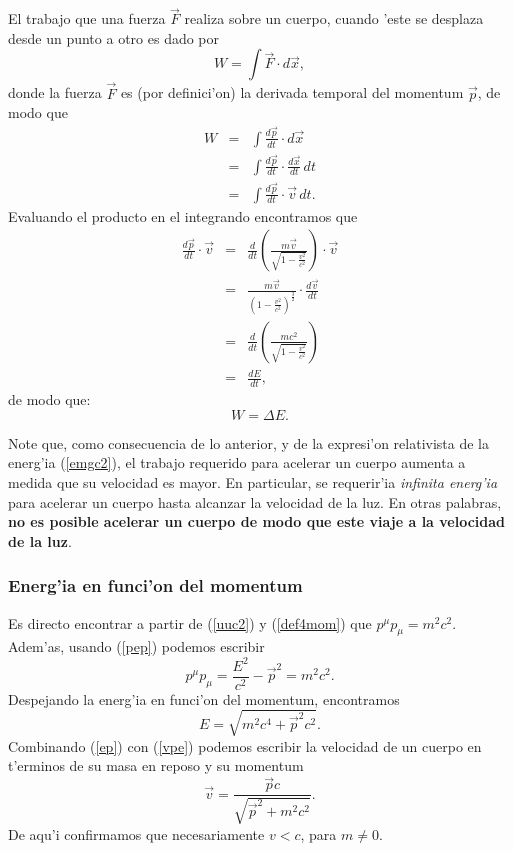 El trabajo que una fuerza $\vec{F}$ realiza sobre un cuerpo, cuando 'este se desplaza desde un punto a otro es dado por
\begin{equation}
W=\int\vec{F} \cdot d\vec{x},
\end{equation}
donde la fuerza $\vec{F}$ es (por definici'on) la derivada temporal del momentum $\vec{p}$, de modo
que
\begin{eqnarray}
W&=&\int\frac{d\vec{p}}{dt} \cdot d\vec{x}\\
&=&\int\frac{d\vec{p}}{dt} \cdot \frac{d\vec{x}}{dt}\,dt\\
&=&\int\frac{d\vec{p}}{dt} \cdot \vec{v}\,dt.
\end{eqnarray}
Evaluando el producto en el integrando encontramos que
\begin{eqnarray}
\frac{d\vec{p}}{dt} \cdot
\vec{v}&=&\frac{d}{dt}(\frac{m\vec{v}}{\sqrt{1-\frac{v^2}{c^2}}})\cdot
\vec{v}\\
&=&\frac{m\vec{v}}{(1-\frac{v^2}{c^2})^{\frac{3}{2}}}\cdot
\frac{d\vec{v}}{dt}\\
&=&\frac{d}{dt}(\frac{mc^2}{\sqrt{1-\frac{v^2}{c^2}}}) \\
&=&\frac{dE}{dt},
\end{eqnarray}
de modo que:
\begin{equation}
\boxed{W=\Delta E.}
\end{equation}

Note que, como consecuencia de lo anterior, y de la expresi'on relativista de la energ'ia (\ref{emgc2}), el trabajo requerido para acelerar un cuerpo aumenta a medida que su velocidad es mayor. En particular, se requerir'ia \textit{infinita energ'ia} para acelerar un cuerpo hasta alcanzar la velocidad de la luz. En otras palabras, \textbf{no es posible acelerar un cuerpo de modo que este viaje a la velocidad de la luz}.

\subsubsection{Energ'ia en funci'on del momentum}

Es directo encontrar a partir de (\ref{uuc2}) y (\ref{def4mom}) que $p^\mu
p_\mu=m^2c^2$. Adem'as, usando (\ref{pep}) podemos escribir
\begin{equation}
p^\mu p_\mu =\frac{E^2}{c^2}-\vec{p}^2=m^2c^2.
\end{equation}
Despejando la energ'ia en funci'on del momentum, encontramos
\begin{equation}
\boxed{E=\sqrt{m^2c^4+\vec{p}^2c^2}.} \label{ep}
\end{equation}
Combinando (\ref{ep}) con (\ref{vpe}) podemos escribir la velocidad de un cuerpo en t'erminos de su masa en reposo y su momentum
\begin{equation}
\vec{v}=\frac{\vec{p}c}{\sqrt{\vec{p}^2+m^2c^2}}. \label{vpp}
\end{equation}
De aqu'i confirmamos que necesariamente $v<c$, para $m\neq 0$.

